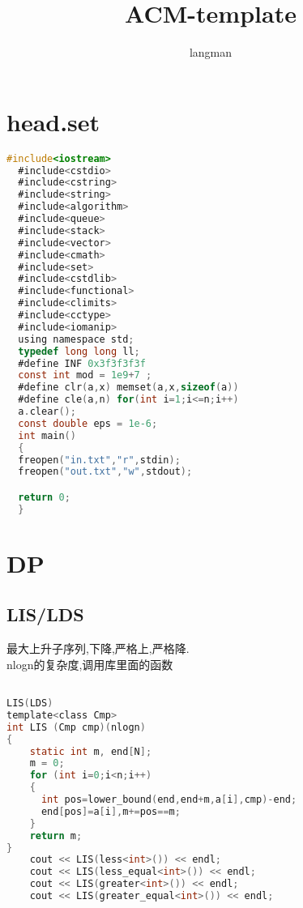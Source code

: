 \documentclass[a4paper,11pt]{article}
\author{langman}
\title{ACM-template}
\begin{document}
\maketitle
\section{head.set}

\begin{lstlisting}[language = C]
  #include<iostream>
  #include<cstdio>
  #include<cstring>
  #include<string>
  #include<algorithm>
  #include<queue>
  #include<stack>
  #include<vector>
  #include<cmath>
  #include<set>
  #include<cstdlib>
  #include<functional>
  #include<climits>
  #include<cctype>
  #include<iomanip>
  using namespace std;
  typedef long long ll;
  #define INF 0x3f3f3f3f
  const int mod = 1e9+7 ;
  #define clr(a,x) memset(a,x,sizeof(a))
  #define cle(a,n) for(int i=1;i<=n;i++)
  a.clear();
  const double eps = 1e-6;
  int main()
  {
  freopen("in.txt","r",stdin);
  freopen("out.txt","w",stdout);

  return 0;
  }

\end{lstlisting}
\section{DP}
\subsection{LIS/LDS}
\begin{CJK}{UTF8}{gkai}
最大上升子序列,下降,严格上,严格降.\\
nlogn的复杂度,调用库里面的函数\\
\end{CJK}
\begin{lstlisting}[language = C]

LIS(LDS)
template<class Cmp>
int LIS (Cmp cmp)(nlogn)
{
    static int m, end[N];
    m = 0;
    for (int i=0;i<n;i++)
    {
      int pos=lower_bound(end,end+m,a[i],cmp)-end;
      end[pos]=a[i],m+=pos==m;
    }
    return m;
}
    cout << LIS(less<int>()) << endl;
    cout << LIS(less_equal<int>()) << endl;
    cout << LIS(greater<int>()) << endl;
    cout << LIS(greater_equal<int>()) << endl;
\end{lstlisting}
\end{document}
